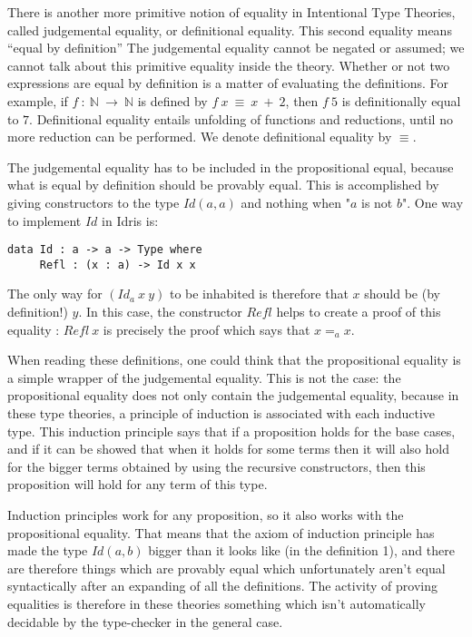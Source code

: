 There is another more
primitive notion of equality in Intentional Type Theories, called judgemental
equality, or definitional equality. This second equality means ``equal by
definition'' The judgemental equality cannot be negated or
assumed; we cannot talk about this primitive equality inside the theory.
Whether or not two expressions are equal by definition is a matter of
evaluating the definitions. For example, if $f\ :\ \mathbb{N}\ \rightarrow\
\mathbb{N}$ is defined by $f\ x\ \equiv\ x\ +\ 2$, then $f\ 5$ is
definitionally equal to $7$. Definitional equality entails unfolding
of functions and reductions, until no more reduction can be
performed. We denote definitional equality by $\equiv$.

The judgemental equality has to be included in the propositional equal, because
what is equal by definition should be provably equal.  This is accomplished by
giving constructors to the type $Id(a,a)$ and nothing when "$a$ is not $b$".
One way to implement $Id$ in Idris is:

\begin{lstlisting}
data Id : a -> a -> Type where
     Refl : (x : a) -> Id x x
\end{lstlisting}

The only way for $(Id_a\ x\ y)$ to be inhabited is therefore that $x$ should be
(by definition!) $y$. In this case, the constructor $Refl$ helps to create a
proof of this equality : $Refl\ x$ is precisely the proof which says that
$x=_ax$. 

When reading these definitions, one could think that the
propositional equality is a simple wrapper of the judgemental equality. This is
not the case: the propositional equality does not only contain the judgemental
equality, because in these type theories, a principle of induction is
associated with each inductive type. This induction principle says that if a
proposition holds for the base cases, and if it can be showed that when it
holds for some terms then it will also hold for the bigger terms obtained by
using the recursive constructors, then this proposition will hold for any term
of this type.

Induction principles work for any proposition, so it also works with the
propositional equality. That means that the axiom of induction principle has
made the type $Id(a,b)$ bigger than it looks like (in the definition 1), and
there are therefore things which are provably equal which unfortunately aren't
equal syntactically after an expanding of all the definitions. The activity of
proving equalities is therefore in these theories something which isn't
automatically decidable by the type-checker in the general case.


